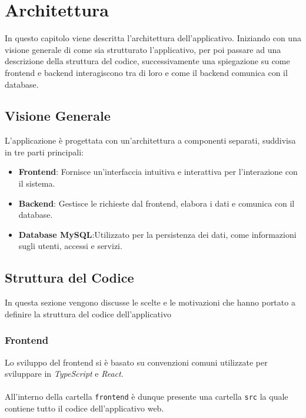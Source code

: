 \documentclass[twoside]{supsistudent}
\begin{document}
\chapter{Architettura}

In questo capitolo viene descritta l’architettura dell’applicativo. Iniziando con una visione generale di come sia strutturato l’applicativo, per poi passare ad una descrizione della struttura del codice, successivamente una spiegazione su come frontend e backend interagiscono tra di loro e come il backend comunica con il database.

\section{Visione Generale}

L'applicazione è progettata con un'architettura a componenti separati, suddivisa in tre parti principali:

\begin{itemize}
  \item \textbf{Frontend}: Fornisce un'interfaccia intuitiva e interattiva per l'interazione con il sistema.
  \item \textbf{Backend}: Gestisce le richieste dal frontend, elabora i dati e comunica con il database.
  \item \textbf{Database MySQL}:Utilizzato per la persistenza dei dati, come informazioni sugli utenti, accessi e servizi.
\end{itemize}



\section{Struttura del Codice}
In questa sezione vengono discusse le scelte e le motivazioni che hanno portato a definire la struttura del codice dell’applicativo

\subsection{Frontend}
Lo sviluppo del frontend si è basato su convenzioni comuni utilizzate per sviluppare in \textit{TypeScript} e \textit{React}.
\\\\
All'interno della cartella \texttt{frontend} è dunque presente una cartella \texttt{src} la quale contiene tutto il codice dell'applicativo web.
\end{document}

